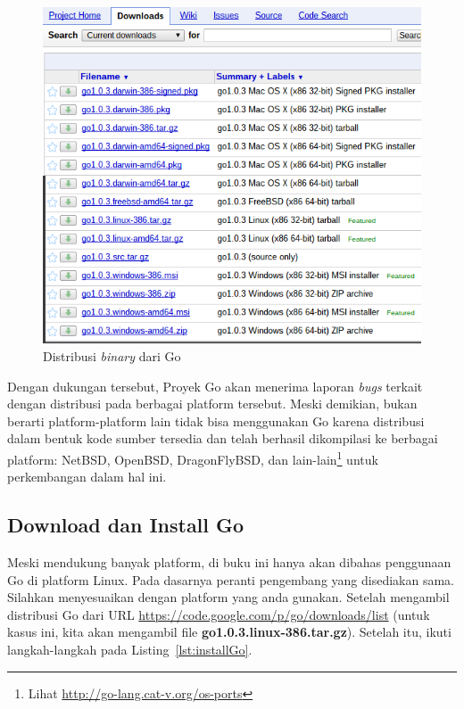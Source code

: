   \begin{figure}
    \begin{center}
      \includegraphics[scale=0.5]{images/download-go.png}
    \end{center}
		\caption{Distribusi \textit{binary} dari Go}
    \label{fig:downloadGo}
  \end{figure}

	Dengan dukungan tersebut, Proyek Go akan menerima laporan \textit{bugs} terkait dengan distribusi pada berbagai platform tersebut. Meski demikian, bukan berarti platform-platform lain tidak bisa menggunakan Go karena distribusi dalam bentuk kode sumber tersedia dan telah berhasil dikompilasi ke berbagai platform: NetBSD, OpenBSD, DragonFlyBSD, dan lain-lain\footnote{Lihat \url{http://go-lang.cat-v.org/os-ports}} untuk perkembangan dalam hal ini.

\subsection{Download dan Install Go}

Meski mendukung banyak platform, di buku ini hanya akan dibahas penggunaan Go di platform Linux. Pada dasarnya peranti pengembang yang disediakan sama. Silahkan menyesuaikan dengan platform yang anda gunakan. Setelah mengambil distribusi Go dari URL \url{https://code.google.com/p/go/downloads/list} (untuk kasus ini, kita akan mengambil file \textbf{go1.0.3.linux-386.tar.gz}). Setelah itu, ikuti langkah-langkah pada Listing~\ref{lst:installGo}.

